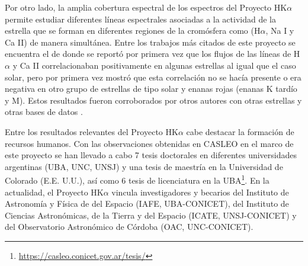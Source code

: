 \documentclass[baaa]{baaa}
\begin{document}
%
Por otro lado, la amplia cobertura espectral de los espectros del Proyecto HK$\alpha$ permite estudiar diferentes líneas espectrales asociadas a la actividad de la estrella que se forman en diferentes regiones de la cromósfera como (H$\alpha$, Na \scriptsize{I}\normalsize\- y Ca \scriptsize{II}\normalsize) de manera simultánea. Entre los trabajos más citados de este proyecto se encuentra el de \cite{2007A&A...461.1107C} donde se reportó por primera vez que los flujos de las líneas de H$\alpha$ y Ca \scriptsize{II}\normalsize\- correlacionaban positivamente en algunas estrellas al igual que el caso solar, pero por primera vez mostró que  esta correlación no se hacía presente o era negativa en otro grupo de estrellas de tipo solar y enanas rojas (enanas K tardío y M). Estos resultados fueron corroborados por otros autores con otras estrellas y otras bases de datos \citep{Walkowicz09,Meunier22,Gomes22}.

Entre los resultados relevantes del Proyecto HK$\alpha$ cabe destacar la formación de recursos humanos. Con las observaciones obtenidas en CASLEO en el marco de este proyecto se han llevado a cabo 7 tesis doctorales en diferentes universidades argentinas (UBA, UNC, UNSJ) y una tesis de maestría en la  Universidad de Colorado (E.E. U.U.), así como 6 tesis de licenciatura en la UBA\footnote{\url{https://casleo.conicet.gov.ar/tesis/}}. En la actualidad, el Proyecto HK$\alpha$ vincula investigadores y becarios del Instituto de Astronomía y Física de del Espacio (IAFE, UBA-CONICET), del Instituto de Ciencias Astron\'omicas, de la Tierra y del Espacio (ICATE, UNSJ-CONICET) y del Observatorio Astronómico de Córdoba (OAC, UNC-CONICET).
\end{document}
